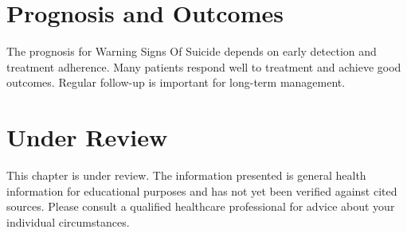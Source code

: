 \section*{Prognosis and Outcomes}
The prognosis for Warning Signs Of Suicide depends on early detection and treatment adherence. Many patients respond well to treatment and achieve good outcomes. Regular follow-up is important for long-term management.
\section*{Under Review}
This chapter is under review. The information presented is general health information for educational purposes and has not yet been verified against cited sources. Please consult a qualified healthcare professional for advice about your individual circumstances.


\clearpage
